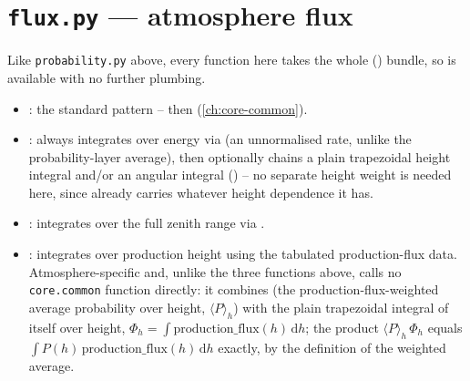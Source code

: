 \section{\texttt{flux.py} --- atmosphere flux}
\label{sec:atmosphere-flux}

{\sloppy{}}

\begin{implbox}
Like \texttt{probability.py} above, every function here takes the whole
 () bundle, so
 is available with no further plumbing.
\begin{itemize}
  \item {}:
    the standard pattern --  then
     (\cref{ch:core-common}).
  \item {}:
    always integrates over energy via
     (an unnormalised rate,
    unlike the probability-layer average), then optionally chains a plain
    trapezoidal height integral and/or an angular integral
    () -- no separate
    height weight is needed here, since  already carries
    whatever height dependence it has.
  \item {}: integrates over
    the full zenith range via
    .
  \item {}:
    integrates over production height using the tabulated production-flux
    data. Atmosphere-specific and, unlike the three functions above, calls
    no \texttt{core.common} function directly: it combines
     (the
    production-flux-weighted average probability over height, $\langle
    P\rangle_h$) with the plain trapezoidal integral of
     itself over height,
    $\Phi_h=\int\text{production\_flux}(h)\,\mathrm{d}h$; the product
    $\langle P\rangle_h\,\Phi_h$ equals $\int P(h)\,\text{production\_flux}(h)\,\mathrm{d}h$
    exactly, by the definition of the weighted average.
\end{itemize}
\end{implbox}

